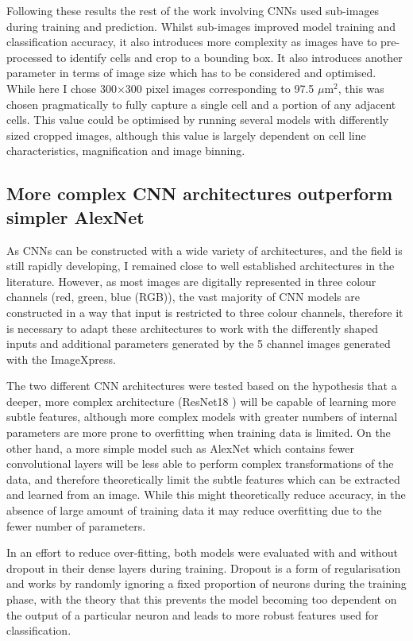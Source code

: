 \documentclass[a4paper,11pt,twoside,openright]{scrbook}
\begin{document}
Following these results the rest of the work involving CNNs used sub-images during training and prediction.
Whilst sub-images improved model training and classification accuracy, it also introduces more complexity as images have to pre-processed to identify cells and crop to a bounding box.
It also introduces another parameter in terms of image size which has to be considered and optimised.
While here I chose 300$\times$300 pixel images corresponding to 97.5 $\mu$m$^2$, this was chosen pragmatically to fully capture a single cell and a portion of any adjacent cells.
This value could be optimised by running several models with differently sized cropped images, although this value is largely dependent on cell line characteristics, magnification and image binning.


\subsection{More complex CNN architectures outperform simpler AlexNet}
As CNNs can be constructed with a wide variety of architectures, and the field is still rapidly developing, I remained close to well established architectures in the literature.
However, as most images are digitally represented in three colour channels (red, green, blue (RGB)), the vast majority of CNN models are constructed in a way that input is restricted to three colour channels, therefore it is necessary to adapt these architectures to work with the differently shaped inputs and additional parameters generated by the 5 channel images generated with the ImageXpress.

The two different CNN architectures were tested based on the hypothesis that a deeper, more complex architecture (ResNet18 \cite{He2015}) will be capable of learning more subtle features, although more complex models with greater numbers of internal parameters are more prone to overfitting when training data is limited.
On the other hand, a more simple model such as AlexNet \cite{Krizhevsky2012} which contains fewer convolutional layers will be less able to perform complex transformations of the data, and therefore theoretically limit the subtle features which can be extracted and learned from an image.
While this might theoretically reduce accuracy, in the absence of large amount of training data it may reduce overfitting due to the fewer number of parameters.

In an effort to reduce over-fitting, both models were evaluated with and without dropout in their dense layers during training.
Dropout is a form of regularisation and works by randomly ignoring a fixed proportion of neurons during the training phase, with the theory that this prevents the model becoming too dependent on the output of a particular neuron and leads to more robust features used for classification.
\end{document}
